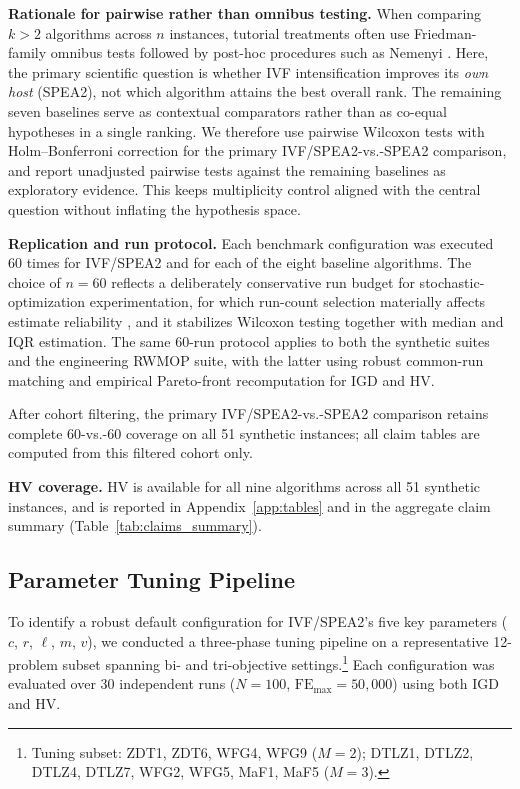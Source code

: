 \documentclass[pdflatex,sn-mathphys-ay]{sn-jnl}%
\theoremstyle{thmstyleone}%
\theoremstyle{thmstyletwo}%
\theoremstyle{thmstylethree}%
\begin{document}
\textbf{Rationale for pairwise rather than omnibus testing.} When comparing $k>2$ algorithms across $n$ instances, tutorial treatments often use Friedman-family omnibus tests followed by post-hoc procedures such as Nemenyi \citep{derrac2011practical}. Here, the primary scientific question is whether IVF intensification improves its \emph{own host} (SPEA2), not which algorithm attains the best overall rank. The remaining seven baselines serve as contextual comparators rather than as co-equal hypotheses in a single ranking. We therefore use pairwise Wilcoxon tests with Holm--Bonferroni correction for the primary IVF/SPEA2-vs.-SPEA2 comparison, and report unadjusted pairwise tests against the remaining baselines as exploratory evidence. This keeps multiplicity control aligned with the central question without inflating the hypothesis space.

\textbf{Replication and run protocol.} Each benchmark configuration was executed 60 times for IVF/SPEA2 and for each of the eight baseline algorithms. The choice of $n=60$ reflects a deliberately conservative run budget for stochastic-optimization experimentation, for which run-count selection materially affects estimate reliability \citep{eftimov2025adaptive}, and it stabilizes Wilcoxon testing together with median and IQR estimation. The same 60-run protocol applies to both the synthetic suites and the engineering RWMOP suite, with the latter using robust common-run matching and empirical Pareto-front recomputation for IGD and HV.

After cohort filtering, the primary IVF/SPEA2-vs.-SPEA2 comparison retains complete 60-vs.-60 coverage on all 51 synthetic instances; all claim tables are computed from this filtered cohort only.

\textbf{HV coverage.} HV is available for all nine algorithms across all 51 synthetic instances, and is reported in Appendix~\ref{app:tables} and in the aggregate claim summary (Table~\ref{tab:claims_summary}).

\subsection{Parameter Tuning Pipeline}\label{subsec:sensitivity}
To identify a robust default configuration for IVF/SPEA2's five key parameters ($c$, $r$, $\ell$, $m$, $v$), we conducted a three-phase tuning pipeline on a representative 12-problem subset spanning bi- and tri-objective settings.\footnote{Tuning subset: ZDT1, ZDT6, WFG4, WFG9 ($M=2$); DTLZ1, DTLZ2, DTLZ4, DTLZ7, WFG2, WFG5, MaF1, MaF5 ($M=3$).} Each configuration was evaluated over 30 independent runs ($N=100$, $\mathrm{FE}_{\max}=50{,}000$) using both IGD and HV.
\end{document}
